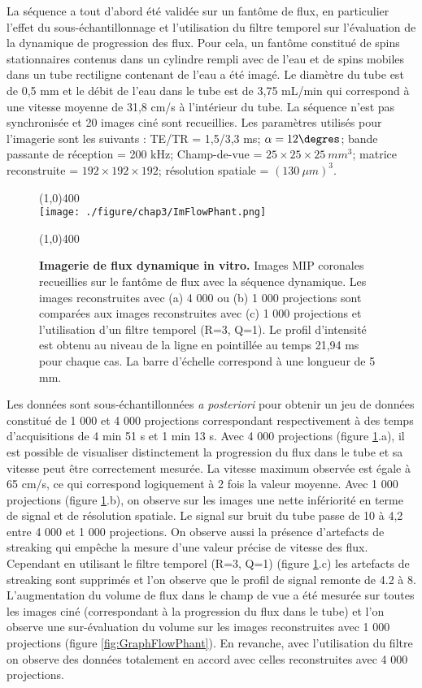 La séquence a tout d'abord été validée sur un fantôme de flux, en particulier l'effet du sous-échantillonnage et l'utilisation du filtre temporel sur l'évaluation de la dynamique de progression des flux. Pour cela, un fantôme constitué de spins stationnaires contenus dans un cylindre rempli avec de l'eau et de spins mobiles dans un tube rectiligne contenant de l'eau a été imagé. Le diamètre du tube est de 0,5 mm et le débit de l'eau dans le tube est de 3,75 mL/min qui correspond à une vitesse moyenne de 31,8 cm/s à l'intérieur du tube. La séquence n'est pas synchronisée et 20 images ciné sont recueillies. Les paramètres utilisés pour l'imagerie sont les suivants : TE/TR = 1,5/3,3 ms; $\alpha=12\degres$; bande passante de réception = 200 kHz; Champ-de-vue = $25 \times 25 \times 25 \ mm^3$; matrice reconstruite = $192 \times 192 \times 192$; résolution spatiale = $(130 \ \mu m)^3$.
\begin{figure}[H]
\centering \line(1,0){400} \\
\texttt{[image: ./figure/chap3/ImFlowPhant.png]}
\caption[Imagerie de flux dynamique in vitro.]{\label{fig:ImFlowPhant} \textbf{Imagerie de flux dynamique in vitro.} Images MIP coronales recueillies sur le fantôme de flux avec la séquence dynamique. Les images reconstruites avec (a) 4 000 ou (b) 1 000 projections sont comparées aux images reconstruites avec (c) 1 000 projections et l'utilisation d'un filtre temporel (R=3, Q=1). Le profil d'intensité est obtenu au niveau de la ligne en pointillée au temps 21,94 ms pour chaque cas. La barre d'échelle correspond à une longueur de 5 mm.}
\line(1,0){400} \\ \end{figure}

Les données sont sous-échantillonnées \textit{a posteriori} pour obtenir un jeu de données constitué de 1 000 et 4 000 projections correspondant respectivement à des temps d'acquisitions de 4 min 51 s et 1 min 13 s. Avec 4 000 projections (figure \ref{fig:ImFlowPhant}.a), il est possible de visualiser distinctement la progression du flux dans le tube et sa vitesse peut être correctement mesurée. La vitesse maximum observée est égale à 65 cm/s, ce qui correspond logiquement à 2 fois la valeur moyenne. Avec 1 000 projections (figure \ref{fig:ImFlowPhant}.b), on observe sur les images une nette infériorité en terme de signal et de résolution spatiale. Le signal sur bruit du tube passe de 10 à 4,2 entre 4 000 et 1 000 projections. On observe aussi la présence d'artefacts de streaking qui empêche la mesure d'une valeur précise de vitesse des flux. Cependant en utilisant le filtre temporel (R=3, Q=1) (figure \ref{fig:ImFlowPhant}.c) les artefacts de streaking sont supprimés et l'on observe que le profil de signal remonte de 4.2 à 8.
L'augmentation du volume de flux dans le champ de vue a été mesurée sur toutes les images ciné (correspondant à la progression du flux dans le tube) et l'on observe une sur-évaluation du volume sur les images reconstruites avec 1 000 projections (figure \ref{fig:GraphFlowPhant}). En revanche, avec l'utilisation du filtre on observe des données totalement en accord avec celles reconstruites avec 4 000 projections.

